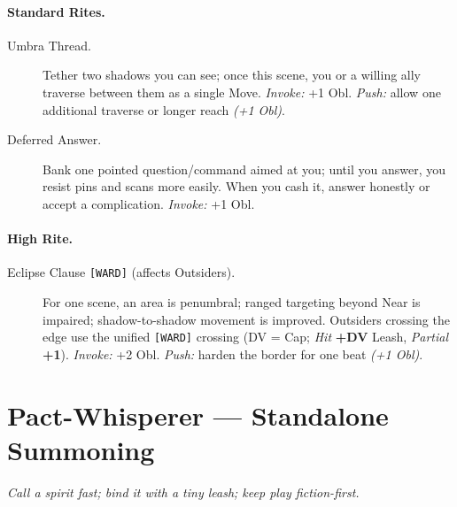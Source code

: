 \paragraph{Standard Rites.}
\begin{description}
  \item[Umbra Thread.] Tether two shadows you can see; once this scene, you or a willing ally traverse between them as a single Move. \emph{Invoke:} +1 Obl. \emph{Push:} allow one additional traverse or longer reach \emph{(+1 Obl)}.
  \item[Deferred Answer.] Bank one pointed question/command aimed at you; until you answer, you resist pins and scans more easily. When you cash it, answer honestly or accept a complication. \emph{Invoke:} +1 Obl.
\end{description}

\paragraph{High Rite.}
\begin{description}
  \item[Eclipse Clause \texttt{[WARD]} (affects Outsiders).] For one scene, an area is penumbral; ranged targeting beyond Near is impaired; shadow-to-shadow movement is improved. Outsiders crossing the edge use the unified \texttt{[WARD]} crossing (DV = Cap; \emph{Hit} \textbf{+DV} Leash, \emph{Partial} \textbf{+1}). \emph{Invoke:} +2 Obl. \emph{Push:} harden the border for one beat \emph{(+1 Obl)}.
\end{description}

\section{Pact-Whisperer — Standalone Summoning}

\textit{Call a spirit fast; bind it with a tiny leash; keep play fiction-first.}

